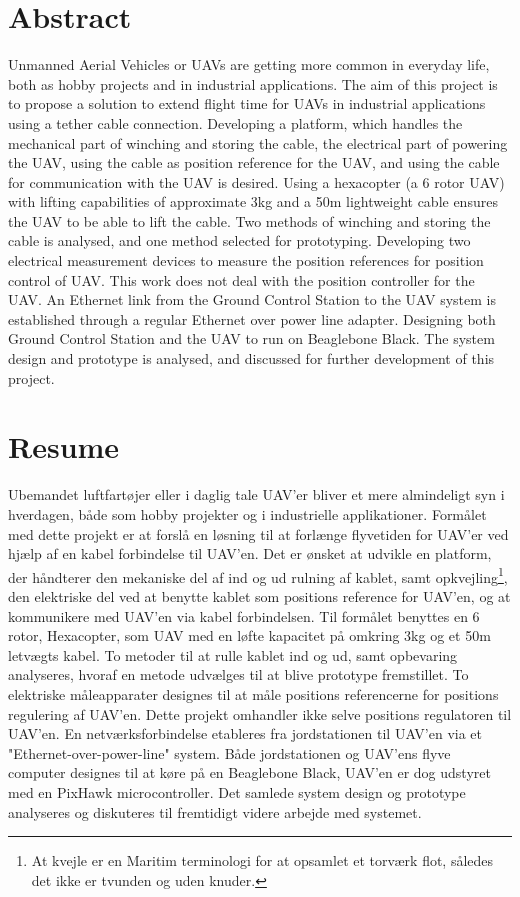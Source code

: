 \chapter{Abstract}
Unmanned Aerial Vehicles or UAVs are getting more common in everyday life, both as hobby projects and in industrial applications. The aim of this project is to propose a solution to extend flight time for UAVs in industrial applications using a tether cable connection. Developing a platform, which handles the mechanical part of winching and storing the cable, the electrical part of powering the UAV, using the cable as position reference for the UAV, and using the cable for communication with the UAV is desired.
Using a hexacopter (a 6 rotor UAV) with lifting capabilities of approximate 3kg and a 50m lightweight cable ensures the UAV to be able to lift the cable.
Two methods of winching and storing the cable is analysed, and one method selected for prototyping.
Developing two electrical measurement devices to measure the position references for position control of UAV. This work does not deal with the position controller for the UAV.
An Ethernet link from the Ground Control Station to the UAV system is established through a regular Ethernet over power line adapter.
Designing both Ground Control Station and the UAV to run on Beaglebone Black.
The system design and prototype is analysed, and discussed for further development of this project.


\chapter{Resume}
Ubemandet luftfartøjer eller i daglig tale UAV'er bliver et mere almindeligt syn i hverdagen, både som hobby projekter og i industrielle applikationer. Formålet med dette projekt er at forslå en løsning til at forlænge flyvetiden for UAV'er ved hjælp af en kabel forbindelse til UAV'en. Det er ønsket at udvikle en platform, der håndterer den mekaniske del af ind og ud rulning af kablet, samt opkvejling\footnote{At kvejle er en Maritim terminologi for at opsamlet et torværk flot, således det ikke er tvunden og uden knuder.}, den elektriske del ved at benytte kablet som positions reference for UAV'en, og at kommunikere med UAV'en via kabel forbindelsen.
Til formålet benyttes en 6 rotor, Hexacopter, som UAV med en løfte kapacitet på omkring 3kg og et 50m letvægts kabel.
To metoder til at rulle kablet ind og ud, samt opbevaring analyseres, hvoraf en metode udvælges til at blive prototype fremstillet.
To elektriske måleapparater designes til at måle positions referencerne for positions regulering af UAV'en. Dette projekt omhandler ikke selve positions regulatoren til UAV'en. En netværksforbindelse etableres fra jordstationen til UAV'en via et "Ethernet-over-power-line" system. Både jordstationen og UAV'ens flyve computer designes til at køre på en Beaglebone Black, UAV'en er dog udstyret med en PixHawk microcontroller.
Det samlede system design og prototype analyseres og diskuteres til fremtidigt videre arbejde med systemet.  